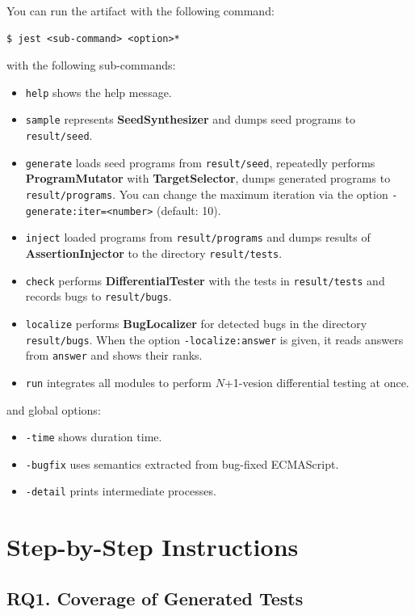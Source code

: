\documentclass[conference]{IEEEtran}
\begin{document}
You can run the artifact with the following command:
\begin{lstlisting}
$ jest <sub-command> <option>*
\end{lstlisting}
with the following sub-commands:
\begin{itemize}
  \item \texttt{help} shows the help message.
  \item \texttt{sample} represents \textbf{SeedSynthesizer} and dumps seed
    programs to \texttt{result/seed}.
  \item \texttt{generate} loads seed programs from \texttt{result/seed},
    repeatedly performs \textbf{ProgramMutator} with \textbf{TargetSelector},
    dumps generated programs to \texttt{result/programs}. You can change the
    maximum iteration via the option \texttt{-generate:iter=<number>} (default:
    10).
  \item \texttt{inject} loaded programs from \texttt{result/programs} and dumps
    results of \textbf{AssertionInjector} to the directory \texttt{result/tests}.
  \item \texttt{check} performs \textbf{DifferentialTester} with the tests in
    \texttt{result/tests} and records bugs to \texttt{result/bugs}.
  \item \texttt{localize} performs \textbf{BugLocalizer} for detected bugs in
    the directory \texttt{result/bugs}. When the option
    \texttt{-localize:answer} is given, it reads answers from \texttt{answer}
    and shows their ranks.
  \item \texttt{run} integrates all modules to perform $N$+1-vesion differential
    testing at once.
\end{itemize}
and global options:
\begin{itemize}
  \item \texttt{-time} shows duration time.
  \item \texttt{-bugfix} uses semantics extracted from bug-fixed ECMAScript.
  \item \texttt{-detail} prints intermediate processes.
\end{itemize}


\section{Step-by-Step Instructions}

\subsection{RQ1. Coverage of Generated Tests}
\end{document}

